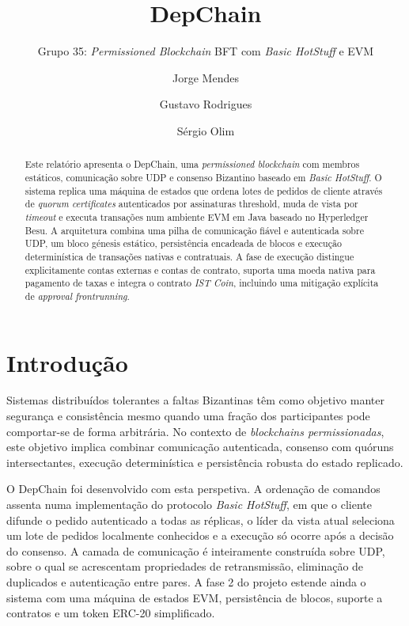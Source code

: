 \documentclass[runningheads]{llncs}
\title{DepChain}
\subtitle{Grupo 35: \textit{Permissioned Blockchain} BFT com \textit{Basic HotStuff} e EVM}
\author{Jorge Mendes \and Gustavo Rodrigues \and S\'ergio Olim}
\institute{Instituto Superior T\'ecnico}
\begin{document}
\maketitle

\begin{abstract}
Este relat\'orio apresenta o DepChain, uma \textit{permissioned blockchain} com membros est\'aticos, comunica\c{c}\~ao sobre UDP e consenso Bizantino baseado em \textit{Basic HotStuff}. O sistema replica uma m\'aquina de estados que ordena lotes de pedidos de cliente atrav\'es de \textit{quorum certificates} autenticados por assinaturas threshold, muda de vista por \textit{timeout} e executa transa\c{c}\~oes num ambiente EVM em Java baseado no Hyperledger Besu. A arquitetura combina uma pilha de comunica\c{c}\~ao fi\'avel e autenticada sobre UDP, um bloco g\'enesis est\'atico, persist\^encia encadeada de blocos e execu\c{c}\~ao determin\'istica de transa\c{c}\~oes nativas e contratuais. A fase de execu\c{c}\~ao distingue explicitamente contas externas e contas de contrato, suporta uma moeda nativa para pagamento de taxas e integra o contrato \textit{IST Coin}, incluindo uma mitiga\c{c}\~ao expl\'icita de \textit{approval frontrunning}.
\end{abstract}

\section{Introdu\c{c}\~ao}
Sistemas distribu\'idos tolerantes a faltas Bizantinas t\^em como objetivo manter seguran\c{c}a e consist\^encia mesmo quando uma fra\c{c}\~ao dos participantes pode comportar-se de forma arbitr\'aria. No contexto de \textit{blockchains permissionadas}, este objetivo implica combinar comunica\c{c}\~ao autenticada, consenso com qu\'oruns intersectantes, execu\c{c}\~ao determin\'istica e persist\^encia robusta do estado replicado.

O DepChain foi desenvolvido com esta perspetiva. A ordena\c{c}\~ao de comandos assenta numa implementa\c{c}\~ao do protocolo \textit{Basic HotStuff}, em que o cliente difunde o pedido autenticado a todas as r\'eplicas, o l\'ider da vista atual seleciona um lote de pedidos localmente conhecidos e a execu\c{c}\~ao s\'o ocorre ap\'os a decis\~ao do consenso. A camada de comunica\c{c}\~ao \'e inteiramente constru\'ida sobre UDP, sobre o qual se acrescentam propriedades de retransmiss\~ao, elimina\c{c}\~ao de duplicados e autentica\c{c}\~ao entre pares. A fase 2 do projeto estende ainda o sistema com uma m\'aquina de estados EVM, persist\^encia de blocos, suporte a contratos e um token ERC-20 simplificado.
\end{document}
